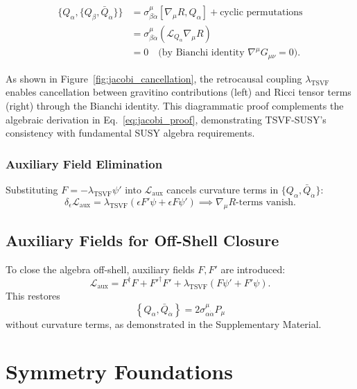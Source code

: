 \documentclass[twocolumn,superscriptaddress,floatfix]{revtex4-2}
\begin{document}
\begin{align}
    \{Q_\alpha, \{Q_\beta, \bar{Q}_{\dot{\alpha}}\}\} 
    &= \sigma^\mu_{\beta\dot{\alpha}} \left[ \nabla_\mu R, Q_\alpha \right] + \text{cyclic permutations} \nonumber \\  
    &= \sigma^\mu_{\beta\dot{\alpha}} \left( \mathcal{L}_{Q_\alpha} \nabla_\mu R \right) \nonumber \\  
    &= 0 \quad \text{(by Bianchi identity $\nabla^\mu G_{\mu\nu} = 0$)}.
    \label{eq:jacobi_proof}
\end{align}

As shown in Figure~\ref{fig:jacobi_cancellation}, the retrocausal coupling $\lambda_{\text{TSVF}}$ enables cancellation between gravitino contributions (left) and Ricci tensor terms (right) through the Bianchi identity. This diagrammatic proof complements the algebraic derivation in Eq.~\eqref{eq:jacobi_proof}, demonstrating TSVF-SUSY's consistency with fundamental SUSY algebra requirements.

\subsubsection{Auxiliary Field Elimination}  
Substituting $F = -\lambda_{\text{TSVF}} \psi'$ into $\mathcal{L}_{\text{aux}}$ cancels curvature terms in $\{Q_\alpha, \bar{Q}_{\dot{\alpha}}\}$:  
\begin{equation}  
\delta_{\epsilon} \mathcal{L}_{\text{aux}} = \lambda_{\text{TSVF}} \left( \epsilon F' \psi + \epsilon F \psi' \right) \implies \nabla_\mu R \text{-terms vanish}.  
\end{equation} 

\subsection{Auxiliary Fields for Off-Shell Closure}  
\label{subsec:auxiliary}    

To close the algebra off-shell, auxiliary fields $F, F'$ are introduced:  
\begin{equation}  
\mathcal{L}_{\text{aux}} = F^\dagger F + F'^\dagger F' + \lambda_{\text{TSVF}}(F\psi' + F'\psi).  
\label{eq:auxiliary}   
\end{equation}  
This restores  
\[
\left\{ Q_{\alpha}, \bar{Q}_{\dot{\alpha}} \right\} = 2\sigma^{\mu}_{\alpha\dot{\alpha}}P_{\mu}
\]
without curvature terms, as demonstrated in the Supplementary Material.
  

\section{Symmetry Foundations}  
\label{sec:symmetry}   
\end{document}

